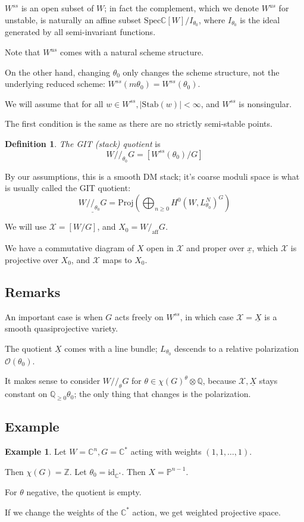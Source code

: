 \documentclass{amsart}
\theoremstyle{definition}
\newtheorem{definition}[dummy]{Definition}
\newtheorem{example}[dummy]{Example}
\newcommand{\Z}{\mathbb{Z}}
\newcommand{\GIT}{//}
\newcommand{\X}{\mathcal{X}}
\newcommand{\Stab}{\text{Stab}}
\newcommand{\Spec}{\text{Spec}}
\newcommand{\aff}{\text{aff}}
\newcommand{\OO}{\mathcal{O}}
\newcommand{\proj}{\mathbb{P}}
\newcommand{\Q}{\mathbb{Q}}
\newcommand{\C}{\mathbb{C}}
\begin{document}
$W^{ss}$ is an open subset of $W$; in fact the complement, which we denote $W^{us}$ for unstable, is naturally an affine subset $\Spec \C[W]/I_{\theta_0}$, where $I_{\theta_0}$ is the ideal generated by all semi-invariant functions.

Note that $W^{us}$ comes with a natural scheme structure.

On the other hand, changing $\theta_0$ only changes the scheme structure, not the underlying reduced scheme: $W^{ss}(m\theta_0)=W^{ss}(\theta_0)$.


We will assume that for all $w\in W^{ss}, |\Stab(w)|<\infty$, and $W^{ss}$ is nonsingular.

The first condition is the same as there are no strictly semi-stable points.

\begin{definition}
\emph{The GIT (stack) quotient} is $$W\GIT_{\theta_0} G=[W^{ss}(\theta_0)/G]$$
\end{definition}
By our assumptions, this is a smooth DM stack; it's coarse moduli space is what is usually called the GIT quotient:
$$\underline{W\GIT_{\theta_0} G}=\text{Proj}(\bigoplus_{n\geq 0} H^0(W, L^N_{\theta_0})^G)$$

We will use $\X=[W/G]$, and $X_0=W/_\aff G$.


We have a commutative diagram of $X$ open in $\X$ and proper over $\underline{x}$, which $\X$ is projective over $X_0$, and $\X$ maps to $X_0$.

\subsection{Remarks}
An important case is when $G$ acts freely on $W^{ss}$, in which case $\X=\underline{X}$ is a smooth quasiprojective variety.

The quotient $\underline{X}$ comes with a line bundle; $L_{\theta_0}$ descends to a relative polarization $\OO(\theta_0)$.

It makes sense to consider $W\GIT_\theta G$ for $\theta\in \chi(G)
^\theta\otimes\Q$, because $\X, \underline{X}$ stays constant on $\Q_{\geq 0}\theta_0$; the only thing that changes is the polarization.

\subsection{Example}

\begin{example}
Let $W=\C^n, G=\C^*$ acting with weights $(1,1,\dots,1)$.

Then $\chi(G)=\Z$.  Let $\theta_0=\text{id}_{\C^*}$.  Then $X=\proj^{n-1}$. 

For $\theta$ negative, the quotient is empty.

If we change the weights of the $\C^*$ action, we get weighted projective space.

\end{example}
\end{document}
